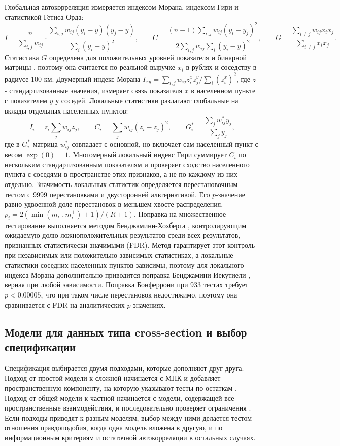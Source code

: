 \documentclass[12pt, a4paper]{article}
\begin{document}
Глобальная автокорреляция измеряется индексом Морана, индексом Гири и статистикой Гетиса-Орда:
\[
I = \frac{n}{\sum_{i,j} w_{ij}} \cdot \frac{\sum_{i,j} w_{ij} (y_i - \bar{y})(y_j - \bar{y})}{\sum_i (y_i - \bar{y})^2}, \qquad
C = \frac{(n - 1) \sum_{i,j} w_{ij} (y_i - y_j)^2}{2 \sum_{i,j} w_{ij} \sum_i (y_i - \bar{y})^2}, \qquad
G = \frac{\sum_{i \ne j} w_{ij} x_i x_j}{\sum_{i \ne j} x_i x_j}.
\]
\indent Статистика $G$ определена для положительных уровней показателя и бинарной матрицы
\cite{getis1992}, поэтому она считается по реальной выручке $x_i$ в рублях и соседству в радиусе
100 км. Двумерный индекс Морана $I_{xy} = \sum_{i,j} w_{ij} z^x_i z^y_j / \sum_i (z^x_i)^2$, где
$z$ - стандартизованные значения, измеряет связь показателя $x$ в населенном пункте с показателем $y$ у
соседей. Локальные статистики разлагают глобальные на вклады отдельных населенных пунктов:
\[
I_i = z_i \sum_j w_{ij} z_j, \qquad
C_i = \sum_j w_{ij} (z_i - z_j)^2, \qquad
G^*_i = \frac{\sum_j w^*_{ij} y_j}{\sum_j y_j},
\]
где в $G^*_i$ матрица $w^*_{ij}$ совпадает с основной, но включает сам населенный пункт с весом
$\exp(0) = 1$. Многомерный локальный индекс Гири суммирует $C_i$ по нескольким стандартизованным
показателям и проверяет сходство населенного пункта с соседями в пространстве этих признаков, а не по каждому
из них отдельно. Значимость локальных статистик определяется перестановочным тестом с 9999
перестановками и двусторонней альтернативой. Его $p$-значение равно удвоенной доле перестановок в
меньшем хвосте распределения, $p_i = 2 (\min(m^-_i, m^+_i) + 1) / (R + 1)$. Поправка на
множественное тестирование выполняется методом Бенджамини-Хохберга \cite{benjamini1995},
контролирующим ожидаемую долю ложноположительных результатов среди всех результатов,
признанных статистически значимыми (FDR). Метод гарантирует этот контроль при независимых или
положительно зависимых статистиках, а локальные статистики соседних населенных пунктов зависимы, поэтому для
локального индекса Морана дополнительно приводится поправка Бенджамини-Иекутиели
\cite{benjamini2001}, верная при любой зависимости. Поправка Бонферрони при 933 тестах требует
$p < 0.00005$, что при таком числе перестановок недостижимо, поэтому она сравнивается с FDR на
аналитических $p$-значениях.

\subsection*{Модели для данных типа cross-section и выбор спецификации}

Спецификация выбирается двумя подходами, которые дополняют друг друга. Подход от простой модели
к сложной начинается с МНК и добавляет пространственную компоненту, на которую указывают тесты
по остаткам \cite{anselin1996}. Подход от общей модели к частной начинается с модели, содержащей
все пространственные взаимодействия, и последовательно проверяет ограничения
\cite{elhorst2014}. Если подходы приводят к разным моделям, выбор между ними делается тестом
отношения правдоподобия, когда одна модель вложена в другую, и по информационным критериям и
остаточной автокорреляции в остальных случаях.
\end{document}
